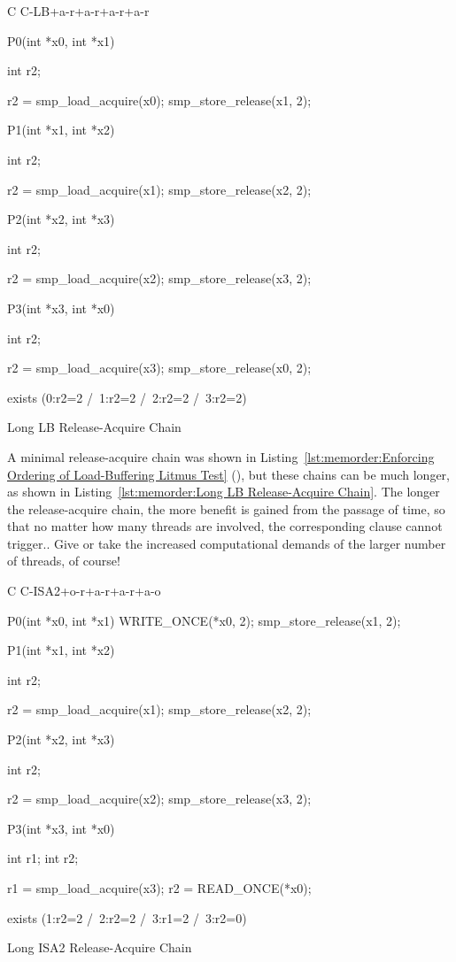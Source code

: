 \begin{listing}[tbp]
{ \scriptsize
\begin{verbbox}[\LstLineNo]
C C-LB+a-r+a-r+a-r+a-r
{
}

P0(int *x0, int *x1)
{
  int r2;

  r2 = smp_load_acquire(x0);
  smp_store_release(x1, 2);
}


P1(int *x1, int *x2)
{
  int r2;

  r2 = smp_load_acquire(x1);
  smp_store_release(x2, 2);
}

P2(int *x2, int *x3)
{
  int r2;

  r2 = smp_load_acquire(x2);
  smp_store_release(x3, 2);
}

P3(int *x3, int *x0)
{
  int r2;

  r2 = smp_load_acquire(x3);
  smp_store_release(x0, 2);
}

exists (0:r2=2 /\ 1:r2=2 /\ 2:r2=2 /\ 3:r2=2)
\end{verbbox}
}
\centering
\theverbbox
\caption{Long LB Release-Acquire Chain}
\label{lst:memorder:Long LB Release-Acquire Chain}
\end{listing}

A minimal release-acquire chain was shown in
Listing~\ref{lst:memorder:Enforcing Ordering of Load-Buffering Litmus Test}
(),
but these chains can be much longer, as shown in
Listing~\ref{lst:memorder:Long LB Release-Acquire Chain}.
The longer the release-acquire chain, the more benefit is gained
from the passage of time, so that no matter how many threads are
involved, the corresponding  clause cannot trigger..
Give or take the increased computational demands of the larger number
of threads, of course!

\begin{listing}[tbp]
{ \scriptsize
\begin{verbbox}[\LstLineNo]
C C-ISA2+o-r+a-r+a-r+a-o
{
}

P0(int *x0, int *x1)
{
  WRITE_ONCE(*x0, 2);
  smp_store_release(x1, 2);
}


P1(int *x1, int *x2)
{
  int r2;

  r2 = smp_load_acquire(x1);
  smp_store_release(x2, 2);
}

P2(int *x2, int *x3)
{
  int r2;

  r2 = smp_load_acquire(x2);
  smp_store_release(x3, 2);
}

P3(int *x3, int *x0)
{
  int r1;
  int r2;

  r1 = smp_load_acquire(x3);
  r2 = READ_ONCE(*x0);
}

exists (1:r2=2 /\ 2:r2=2 /\ 3:r1=2 /\ 3:r2=0)
\end{verbbox}
}
\centering
\theverbbox
\caption{Long ISA2 Release-Acquire Chain}
\label{lst:memorder:Long ISA2 Release-Acquire Chain}
\end{listing}


